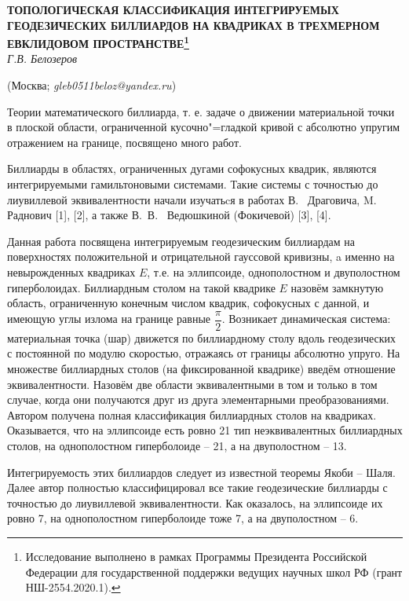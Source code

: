 \begin{center}
    {\bf ТОПОЛОГИЧЕСКАЯ КЛАССИФИКАЦИЯ ИНТЕГРИРУЕМЫХ ГЕОДЕЗИЧЕСКИХ БИЛЛИАРДОВ НА КВАДРИКАХ В ТРЕХМЕРНОМ ЕВКЛИДОВОМ ПРОСТРАНСТВЕ\footnote{Исследование выполнено в рамках Программы Президента Российской Федерации для государственной поддержки ведущих научных школ РФ (грант НШ-2554.2020.1).}}\\

    {\it Г.В. Белозеров}

    (Москва; {\it gleb0511beloz@yandex.ru})
\end{center}


Теории математического биллиарда, т. е. задаче о движении материальной
точки в плоской области, ограниченной кусочно"=гладкой кривой с абсолютно
упругим отражением на границе, посвящено много работ.

Биллиарды в областях, ограниченных дугами софокусных квадрик, являются интегрируемыми гамильтоновыми системами.
Такие системы с точностью до лиувиллевой эквивалентности начали изучатьcя
в работах В.~ Драговича, M.~ Раднович [1], [2], а также В.\, В.~ Ведюшкиной (Фокичевой) [3], [4].

Данная работа посвящена интегрируемым геодезическим биллиардам на поверхностях положительной и отрицательной гауссовой
кривизны, a именно на невырожденных квадриках $E$, т.е. на эллипсоиде, однополостном и двуполостном гиперболоидах.
Биллиардным столом на такой квадрике $E$ назовём замкнутую область,
ограниченную конечным числом квадрик, софокусных с данной, и имеющую углы излома на границе равные
$\dfrac{\pi}{2}$. Возникает динамическая система:
материальная точка (шар) движется по биллиардному столу
вдоль геодезических с постоянной по модулю скоростью, отражаясь от границы абсолютно упруго. На
множестве биллиардных столов (на фиксированной квадрике) введём отношение эквивалентности.
Назовём две области эквивалентными
в том и только в том случае, когда они получаются друг из друга элементарными преобразованиями.
Автором получена полная классификация биллиардных столов на квадриках. Оказывается, что
на эллипсоиде есть ровно 21 тип неэквивалентных биллиардных столов, на однополостном гиперболоиде -- 21, а на двуполостном -- 13.


Интегрируемость этих биллиардов следует из известной теоремы Якоби -- Шаля.
Далее автор полностью классифицировал все такие геодезические биллиарды с
точностью до лиувиллевой эквивалентности. Как оказалось, на эллипсоиде их ровно 7, на однополостном гиперболоиде тоже 7, а на двуполостном -- 6.

